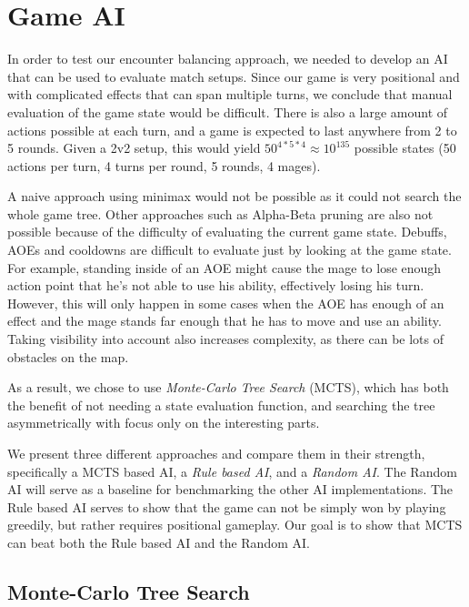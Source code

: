 \chapter{Game AI}
\label{chapter03}

In order to test our encounter balancing approach, we needed to develop an
AI that can be used to evaluate match setups. Since our game is very
positional and with complicated effects that can span multiple turns, we
conclude that manual evaluation of the game state would be difficult.
There is also a large amount of actions possible at each turn, and a game is expected
to last anywhere from 2 to 5 rounds. Given a 2v2 setup, this would yield
$50^{4*5*4} \approx 10^{135}$ possible states (50 actions per turn, 4 turns per round, 5 rounds, 4 mages).

A naive approach using minimax \citep{ai-modern} would not be possible as it could not search the whole game tree. Other approaches such as Alpha-Beta pruning \citep{ai-modern} are also not possible because of the difficulty of evaluating the current game state. Debuffs, AOEs and cooldowns are difficult to evaluate just by looking at the game state. For example, standing inside of an AOE might cause the mage to lose enough action point that he's not able to use his ability, effectively losing his turn. However, this will only happen in some cases when the AOE has enough of an effect and the mage stands far enough that he has to move and use an ability. Taking visibility into account also increases complexity, as there can be lots of obstacles on the map.

As a result, we chose to use \emph{Monte-Carlo Tree Search} (MCTS), which has both the benefit of not needing a state evaluation function, and searching the tree asymmetrically with focus only on the interesting parts.

We present three different approaches and compare them in their strength,
specifically a MCTS based AI, a \emph{Rule based AI}, and a \emph{Random AI}. The Random AI will serve
as a baseline for benchmarking the other AI implementations. The Rule based AI serves to show that the game
can not be simply won by playing greedily, but rather requires positional gameplay. Our goal is to show
that MCTS can beat both the Rule based AI and the Random AI\@.

\section{Monte-Carlo Tree Search}

